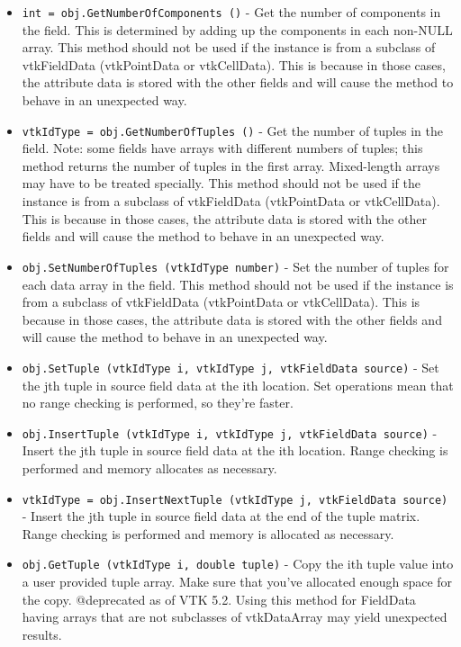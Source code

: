 \begin{itemize}
\item  \verb|int = obj.GetNumberOfComponents ()| -  Get the number of components in the field. This is determined by adding
 up the components in each non-NULL array.
 This method should not be used if the instance is from a
 subclass of vtkFieldData (vtkPointData or vtkCellData).
 This is because in those cases, the attribute data is 
 stored with the other fields and will cause the method
 to behave in an unexpected way.

\item  \verb|vtkIdType = obj.GetNumberOfTuples ()| -  Get the number of tuples in the field. Note: some fields have arrays with
 different numbers of tuples; this method returns the number of tuples in
 the first array. Mixed-length arrays may have to be treated specially.
 This method should not be used if the instance is from a
 subclass of vtkFieldData (vtkPointData or vtkCellData).
 This is because in those cases, the attribute data is 
 stored with the other fields and will cause the method
 to behave in an unexpected way.

\item  \verb|obj.SetNumberOfTuples (vtkIdType number)| -  Set the number of tuples for each data array in the field.
 This method should not be used if the instance is from a
 subclass of vtkFieldData (vtkPointData or vtkCellData).
 This is because in those cases, the attribute data is 
 stored with the other fields and will cause the method
 to behave in an unexpected way.

\item  \verb|obj.SetTuple (vtkIdType i, vtkIdType j, vtkFieldData source)| -  Set the jth tuple in source field data at the ith location. 
 Set operations mean that no range checking is performed, so 
 they're faster.

\item  \verb|obj.InsertTuple (vtkIdType i, vtkIdType j, vtkFieldData source)| -  Insert the jth tuple in source field data at the ith location. 
 Range checking is performed and memory allocates as necessary.

\item  \verb|vtkIdType = obj.InsertNextTuple (vtkIdType j, vtkFieldData source)| -  Insert the jth tuple in source field data  at the end of the 
 tuple matrix. Range checking is performed and memory is allocated 
 as necessary.

\item  \verb|obj.GetTuple (vtkIdType i, double tuple)| -  Copy the ith tuple value into a user provided tuple array. Make
 sure that you've allocated enough space for the copy.
 @deprecated as of VTK 5.2. Using this method for FieldData
 having arrays that are not subclasses of vtkDataArray may
 yield unexpected results.


\end{itemize}
